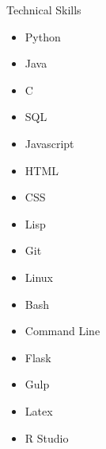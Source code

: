\documentclass{resume} %
\begin{document}
\begin{rSection}{Technical Skills}

\begin{minipage}[t]{4cm}
    \begin{itemize}
        \item Python
        \item Java 
        \item C
        \item SQL
    \end{itemize}
\end{minipage}
\begin{minipage}[t]{4cm}
    \begin{itemize}
        \item Javascript
        \item HTML
        \item CSS
        \item Lisp
    \end{itemize}
\end{minipage}
\begin{minipage}[t]{4cm}
    \begin{itemize}
        \item Git        
        \item Linux
        \item Bash
        \item Command Line
    \end{itemize}
\end{minipage}
\begin{minipage}[t]{4cm}
    \begin{itemize}
    		\item Flask
        \item Gulp
        \item Latex
        \item R Studio
    \end{itemize}
\end{minipage}

\end{rSection}

\end{document}
